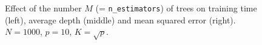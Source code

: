 \begin{figure}
\hspace{-4cm}
\caption{Effect of the number $M$ (= \texttt{n\_estimators})  of trees on training time (left), average depth (middle) and mean squared error (right). $N=1000$, $p=10$, $K=\sqrt{p}$.}
\label{fig:5:artificial:M}
\end{figure}

